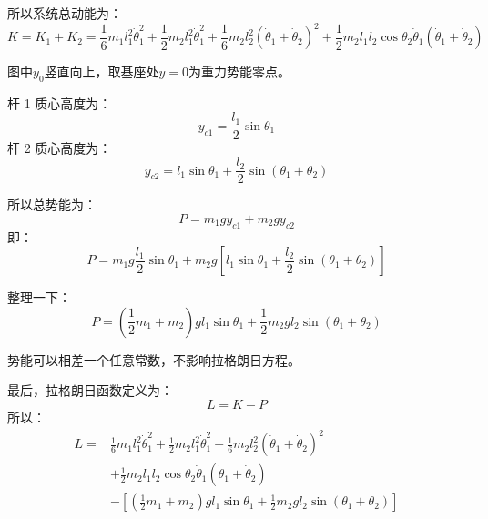 {所以系统总动能为：
$$
K=K_1+K_2=\frac{1}{6}m_1l_1^2\dot{\theta}_1^2+\frac{1}{2}m_2l_1^2\dot{\theta}_1^2+\frac{1}{6}m_2l_2^2(\dot{\theta}_1+\dot{\theta}_2)^2+\frac{1}{2}m_2l_1l_2\cos\theta_2\dot{\theta}_1(\dot{\theta}_1+\dot{\theta}_2)
$$

图中$y_0$竖直向上，取基座处$y=0$为重力势能零点。

杆 1 质心高度为：
$$
y_{c1}=\frac{l_1}{2}\sin\theta_1
$$
杆 2 质心高度为：
$$
y_{c2} = l_1\sin\theta_1+\frac{l_2}{2}\sin(\theta_1+\theta_2)
$$

所以总势能为：
$$
P=m_1gy_{c1}+m_2gy_{c2}
$$
即：
$$
P=m_1g\frac{l_1}{2}\sin\theta_1+m_2g\left[l_1\sin\theta_1+\frac{l_2}{2}\sin(\theta_1+\theta_2)\right]
$$

整理一下：
$$
P=\left(\frac{1}{2}m_1+m_2\right)gl_1\sin\theta_1+\frac{1}{2}m_2gl_2\sin(\theta_1+\theta_2)
$$

势能可以相差一个任意常数，不影响拉格朗日方程。

最后，拉格朗日函数定义为：
$$
L=K-P
$$
所以：
$$
\begin{aligned}
L=&\frac{1}{6}m_1l_1^2\dot{\theta}_1^2+\frac{1}{2}m_2l_1^2\dot{\theta}_1^2+\frac{1}{6}m_2l_2^2(\dot{\theta}_1+\dot{\theta}_2)^2 \\
&+\frac{1}{2}m_2l_1l_2\cos\theta_2\dot{\theta}_1(\dot{\theta}_1+\dot{\theta}_2)\\
&-\left[\left(\frac{1}{2}m_1+m_2\right)gl_1\sin\theta_1+\frac{1}{2}m_2gl_2\sin(\theta_1+\theta_2)\right]
\end{aligned}
$$
}

